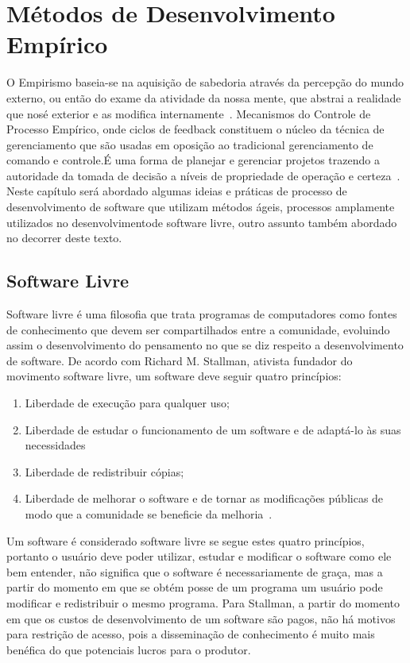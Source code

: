 
\chapter{Métodos de Desenvolvimento Empírico}
\label{cap:desenvolvimento-empirico}

O Empirismo baseia-se na aquisição de sabedoria através da percepção do mundo 
externo, ou então do exame da atividade da nossa mente, que abstrai a realidade 
que nosé exterior e as modifica internamente~\cite{chaui2003}.
%
Mecanismos do Controle de Processo Empírico, onde ciclos de feedback constituem o
núcleo da técnica de gerenciamento que são usadas em oposição ao tradicional 
gerenciamento de comando e controle.É uma forma de planejar e gerenciar projetos 
trazendo a autoridade da tomada de decisão a níveis de propriedade de operação e 
certeza~\cite{Schwaber2004}.
%
Neste capítulo será abordado algumas ideias e práticas de processo de desenvolvimento
de software que utilizam métodos ágeis, processos amplamente utilizados no 
desenvolvimentode software livre, outro assunto também abordado no decorrer 
deste texto.
%
\section{Software Livre}

Software livre é uma filosofia que trata programas de computadores como fontes de 
conhecimento que devem ser compartilhados entre a comunidade, evoluindo assim o 
desenvolvimento do pensamento no que se diz respeito a desenvolvimento de software.
%
De acordo com Richard M. Stallman, ativista fundador do movimento software livre, 
um software deve seguir quatro princípios:
%
\begin{enumerate}
\item Liberdade de execução para qualquer uso;
\item Liberdade de estudar o funcionamento de um software e de adaptá-lo às suas 
necessidades
\item Liberdade de redistribuir cópias;
\item Liberdade de melhorar o software e de tornar as modificações públicas de modo 
que a comunidade se beneficie da melhoria~\cite{stallman2001}.
\end{enumerate}
%
Um software é considerado software livre se segue estes quatro princípios, portanto 
o usuário deve poder utilizar, estudar e modificar o software como ele bem entender, 
não significa que o software é necessariamente de graça, mas a partir do momento em 
que se obtém posse de um programa um usuário pode modificar e redistribuir o mesmo 
programa.
%
Para Stallman, a partir do momento em que os custos de desenvolvimento de um software 
são pagos, não há motivos para restrição de acesso, pois a disseminação de conhecimento 
é muito mais benéfica do que potenciais lucros para o produtor.
%


